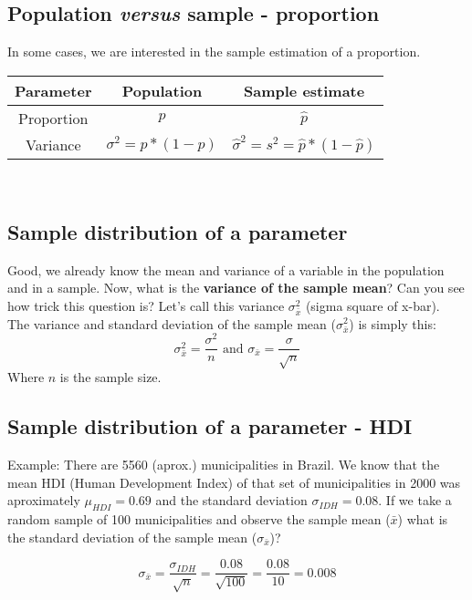 \documentclass[11pt]{article}
\begin{document}
	\subsection*{Population \emph{versus} sample - proportion}
	In some cases, we are interested in the sample estimation of a proportion.\newline\\
\begin{tabular}{|c|c|c|}
\hline
	Parameter & Population & Sample estimate\\ 
\hline
	Proportion & $p$ & $\hat{p}$\\
	Variance & $\sigma^2 = p*(1-p)$ & $\hat{\sigma}^2 = s^2 = \hat{p}*(1-\hat{p})$\\

\hline
\end{tabular}
\newline\\



	\subsection*{Sample distribution of a parameter}
	Good, we already know the mean and variance of a variable in the population and in a sample. Now, what is the \textbf{variance of the sample mean}? Can you see how trick this question is? Let's call this variance $\sigma_{\bar{x}}^2$ (sigma square of x-bar).
\newline\\
	The variance and standard deviation of the sample mean ($\sigma_{\bar{x}}^2$) is simply this:
\[\sigma_{\bar{x}}^2 = \frac{\sigma^2}{n} \text{ and }\sigma_{\bar{x}} = \frac{\sigma}{\sqrt{n}}\]
Where $n$ is the sample size.

	\subsection*{Sample distribution of a parameter - HDI}
Example: There are 5560 (aprox.) municipalities in Brazil. We know that the mean HDI (Human Development Index) of that set of municipalities in 2000 was aproximately $\mu_{HDI}=0.69$ and the standard deviation $\sigma_{IDH} = 0.08$. If we take a random sample of 100 municipalities and observe the sample mean ($\bar{x}$) what is the standard deviation of the sample mean ($\sigma_{\bar{x}}$)?

\[\sigma_{\bar{x}} = \frac{\sigma_{IDH}}{\sqrt{n}} = \frac{0.08}{\sqrt{100}} = \frac{0.08}{10} = 0.008\]
\end{document}
